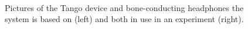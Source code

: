 \documentclass{llncs}
\begin{document}
\begin{figure}
  \centering
  ~
  \caption{Pictures of the Tango device and bone-conducting headphones the system is based on (left) and both in use in an experiment (right).}
\end{figure}
\end{document}
